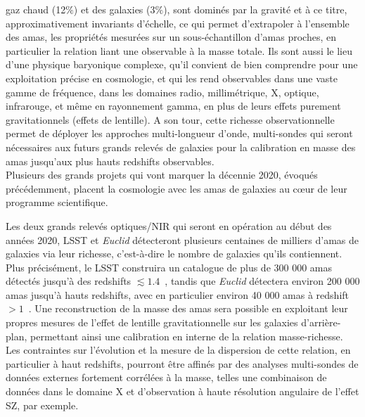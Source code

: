 gaz chaud (12$\%$) et des galaxies (3$\%$), sont dominés par la
gravité et à ce titre, approximativement invariants d'échelle, ce qui
permet d'extrapoler à l'ensemble des amas, les propriétés mesurées sur
un sous-échantillon d'amas proches, en particulier la relation liant
une observable à la masse totale. Ils sont aussi le lieu d’une
physique baryonique complexe, qu’il convient de bien comprendre pour
une exploitation précise en cosmologie, et qui les rend
observables dans une vaste gamme de fréquence, dans les domaines
radio, millimétrique, X, optique, infrarouge, et même en rayonnement
gamma, en plus de leurs effets purement gravitationnels (effets de
lentille). A son tour, cette richesse observationnelle permet de
déployer les approches multi-longueur d’onde, multi-sondes
qui seront nécessaires aux futurs grands relevés de galaxies pour la
calibration en masse des amas jusqu'aux plus hauts redshifts
observables.\\


Plusieurs des grands projets qui vont marquer la décennie 2020, évoqués
précédemment, placent la cosmologie avec les amas de galaxies au cœur
de leur programme scientifique.

Les deux grands relevés optiques/NIR qui seront en opération au début
des années 2020, LSST et \emph{Euclid} détecteront plusieurs centaines
de milliers d'amas de galaxies via leur richesse,
c'est-à-dire le nombre de galaxies qu'ils contiennent. Plus
précisément, le LSST construira un catalogue de plus de 300 000 amas
détectés jusqu'à des redshifts $\lesssim 1.4$~\citep{LSST2019}, tandis
que \emph{Euclid} détectera environ 200 000 amas jusqu'à hauts
redshifts, avec en particulier environ 40 000 amas à redshift
$>1$~\citep{Sartoris2016, Adam2019_euclid}. Une reconstruction de la
masse des amas sera possible en exploitant leur propres mesures de l'effet de
lentille gravitationnelle sur les galaxies d'arrière-plan, permettant
ainsi une calibration en interne de la relation
masse-richesse. Les contraintes sur l'évolution et la mesure de la
dispersion de cette relation, en particulier à haut redshifts,
pourront être affinés par des analyses multi-sondes de données
externes fortement corrélées à la masse, telles une combinaison de
données dans le domaine X et d'observation à haute résolution
angulaire de l'effet SZ, par exemple.

